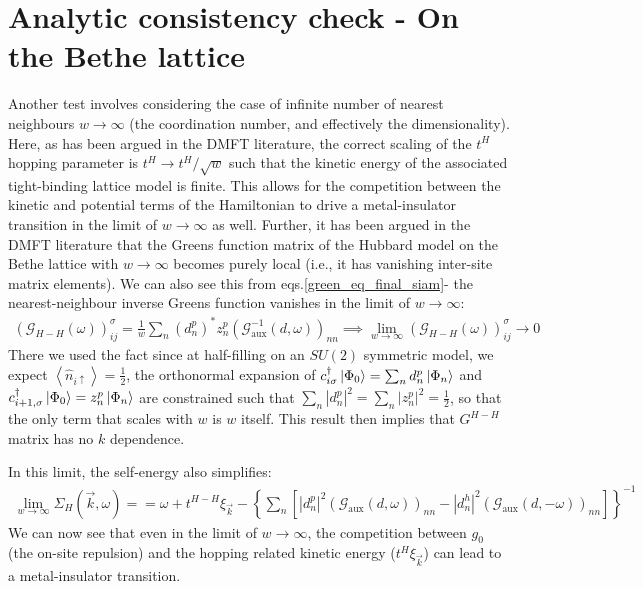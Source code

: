 \documentclass{report}
\numberwithin{equation}{section}
\begin{document}
\section{Analytic consistency check - On the Bethe lattice}
Another test involves considering the case of infinite number of nearest neighbours $w\to\infty$ (the coordination number, and effectively the dimensionality). Here, as has been argued in the DMFT literature, the correct scaling of the $t^{H}$ hopping parameter is $t^{H}\to t^{H}/\sqrt{w}$ such that the kinetic energy of the associated tight-binding lattice model is finite. This allows for the competition between the kinetic and potential terms of the Hamiltonian to drive a metal-insulator transition in the limit of $w\to\infty$ as well. Further, it has been argued in the DMFT literature that the Greens function matrix of the Hubbard model on the Bethe lattice with $w\to\infty$ becomes purely local (i.e., it has vanishing inter-site matrix elements). We can also see this from eqs.\eqref{green_eq_final_siam}- the nearest-neighbour inverse Greens function vanishes in the limit of $w \to \infty$:
\begin{equation}\begin{aligned}
	\left(\mathcal{G}_{H-H}(\omega)\right)_{ij}^\sigma = \frac{1}{w} \sum_n \left(d^p_n\right)^* z^p_n \left(\mathcal{G}^{-1}_\text{aux}(d, \omega) \right)_{nn} \implies \lim_{w \to \infty}\left(\mathcal{G}_{H-H}(\omega)\right)_{ij}^\sigma \to 0
\end{aligned}\end{equation}
There we used the fact since at half-filling on an $SU(2)$ symmetric model, we expect $\left<\hat n_{i \uparrow} \right> = \frac{1}{2}$, the orthonormal expansion of $c^\dagger_{i \sigma}\ket{\Phi_0} = \sum_n d^p_n \ket{\Phi_n}$ and \(c^\dagger_{i+1,\sigma}\ket{\Phi_0}=z^p_n\ket{\Phi_n}\) are constrained such that $\sum_n |d^p_n|^2 = \sum_n |z^p_n|^2 = \frac{1}{2}$, so that the only term that scales with $w$ is $w$ itself. This result then implies that $G^{H-H}$ matrix has no $k$ dependence. 

In this limit, the self-energy also simplifies:
\begin{equation}\begin{aligned}
	\lim_{w \to \infty}\Sigma_H(\vec k,\omega) = = \omega +t^{H-H}\xi_{\vec k} - \left\{\sum_n \left[|d^p_n|^2  \left(\mathcal{G}_\text{aux}(d, \omega)\right)_{nn}- |d^h_n|^2 \left(\mathcal{G}_\text{aux}(d, -\omega)\right)_{nn}\right]\right\}^{-1}
\end{aligned}\end{equation}
We can now see that even in the limit of $w\to\infty$, the competition between ${g}_{0}$ (the on-site repulsion) and the hopping related kinetic energy ($t^{H}\xi_{\vec{k}}$) can lead to a metal-insulator transition.
\end{document}
